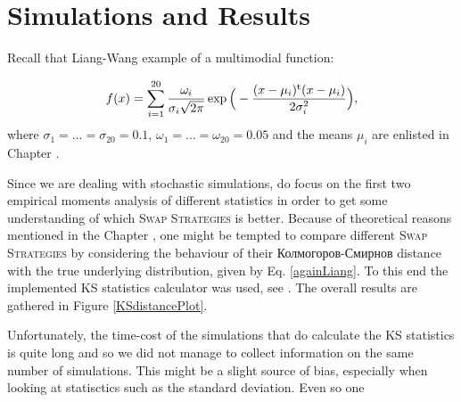\documentclass{book}
\begin{document}
\chapter{ Simulations and Results }\label{simulationsAndResults}

Recall that Liang-Wang example of a multimodial function:

\begin{equation}\label{againLiang}
f(x) = 
\sum_{i=1}^{20} \frac{\omega_i}{ \sigma_i \sqrt{2 \pi} } \exp \Big( -\frac{(x - \mu_i)^{\mathrm{t}} (x - \mu_i)}{2 \sigma_i^2} \Big),	
\end{equation}
where $\sigma_1 = \dots = \sigma_{20} = 0.1$, $\omega_1 = \dots = \omega_{20} = 0.05 $ and the means $\mu_i$ are enlisted in Chapter .

Since we are dealing with stochastic simulations, do focus on the first two empirical moments analysis of different statistics in order to get some understanding of which \textsc{Swap Strategies} is better. 
Because of theoretical reasons mentioned in the Chapter , one might be tempted to compare different \textsc{Swap Strategies} by considering the behaviour of their Колмогоров-Смирнов distance with the true underlying distribution, given by Eq. \ref{againLiang}. To this end the implemented KS statistics calculator was used, see . The overall results are gathered in Figure \ref{KSdistancePlot}. 
	
Unfortunately, the time-cost of the simulations that do calculate the KS statistics is quite long and so we did not manage to collect information on the same number of simulations. This might be a slight source of bias, especially when looking at statisctics such as the standard deviation. Even so one
\end{document}
